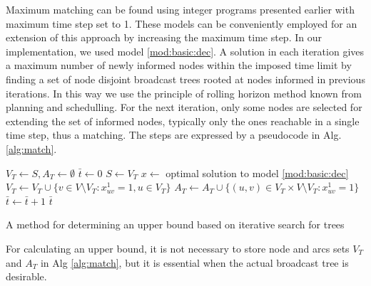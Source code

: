 Maximum matching can be found using integer programs presented earlier with maximum time step set to 1.
These models can be conveniently employed for an extension of this approach by increasing the maximum time step.
In our implementation, we used model \eqref{mod:basic:dec}.
A solution in each iteration gives a maximum number of newly informed nodes within the imposed time limit by finding a set of node disjoint broadcast trees rooted at nodes informed in previous iterations.
In this way we use the principle of rolling horizon method known from planning and schedulling.
For the next iteration, only some nodes are selected for extending the set of informed nodes, typically only the ones reachable in a single time step, thus a matching.
The steps are expressed by a pseudocode in Alg. \ref{alg:match}.
\begin{algorithm}[]
$V_T\leftarrow S, A_T \leftarrow \emptyset$\;
$\bar{t}\leftarrow 0$\;
 {
	$S\leftarrow V_T$\;
	$x\leftarrow$ optimal solution to model \eqref{mod:basic:dec}\;
	$V_T\leftarrow V_T\cup \{v\in V\setminus V_T:x_{uv}^1=1, u\in V_T\}$\;
	$A_T\leftarrow A_T\cup \{(u,v)\in V_T\times V\setminus V_T: x_{uv}^1=1\}$\;
	$\bar{t}\leftarrow \bar{t}+1$\;
}
\Return $\bar{t}$\;
 \caption{A method for determining an upper bound based on iterative search for  trees}
\label{alg:match}
\end{algorithm}

For calculating an upper bound, it is not necessary to store node and arcs sets $V_T$ and $A_T$ in Alg \ref{alg:match},
but it is essential when the actual broadcast tree is desirable.
